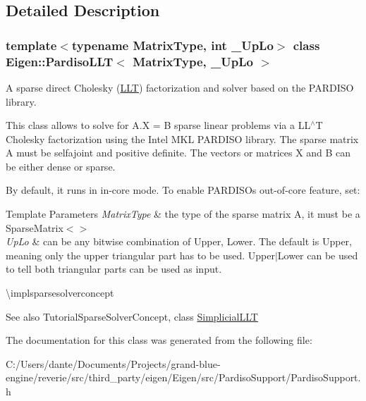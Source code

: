 \subsection{Detailed Description}
\subsubsection*{template$<$typename Matrix\+Type, int \+\_\+\+Up\+Lo$>$\newline
class Eigen\+::\+Pardiso\+L\+L\+T$<$ Matrix\+Type, \+\_\+\+Up\+Lo $>$}

A sparse direct Cholesky (\mbox{\hyperlink{class_eigen_1_1_l_l_t}{L\+LT}}) factorization and solver based on the P\+A\+R\+D\+I\+SO library. 

This class allows to solve for A.\+X = B sparse linear problems via a L\+L$^\wedge$T Cholesky factorization using the Intel M\+KL P\+A\+R\+D\+I\+SO library. The sparse matrix A must be selfajoint and positive definite. The vectors or matrices X and B can be either dense or sparse.

By default, it runs in in-\/core mode. To enable P\+A\+R\+D\+I\+SO\textquotesingle{}s out-\/of-\/core feature, set\+: 
\begin{DoxyCode}{0}
\end{DoxyCode}



\begin{DoxyTemplParams}{Template Parameters}
{\em Matrix\+Type} & the type of the sparse matrix A, it must be a Sparse\+Matrix$<$$>$ \\
\hline
{\em Up\+Lo} & can be any bitwise combination of Upper, Lower. The default is Upper, meaning only the upper triangular part has to be used. Upper$\vert$\+Lower can be used to tell both triangular parts can be used as input.\\
\hline
\end{DoxyTemplParams}
\textbackslash{}implsparsesolverconcept

\begin{DoxySeeAlso}{See also}
Tutorial\+Sparse\+Solver\+Concept, class \mbox{\hyperlink{class_eigen_1_1_simplicial_l_l_t}{Simplicial\+L\+LT}} 
\end{DoxySeeAlso}


The documentation for this class was generated from the following file\+:\begin{DoxyCompactItemize}
\item 
C\+:/\+Users/dante/\+Documents/\+Projects/grand-\/blue-\/engine/reverie/src/third\+\_\+party/eigen/\+Eigen/src/\+Pardiso\+Support/Pardiso\+Support.\+h\end{DoxyCompactItemize}
